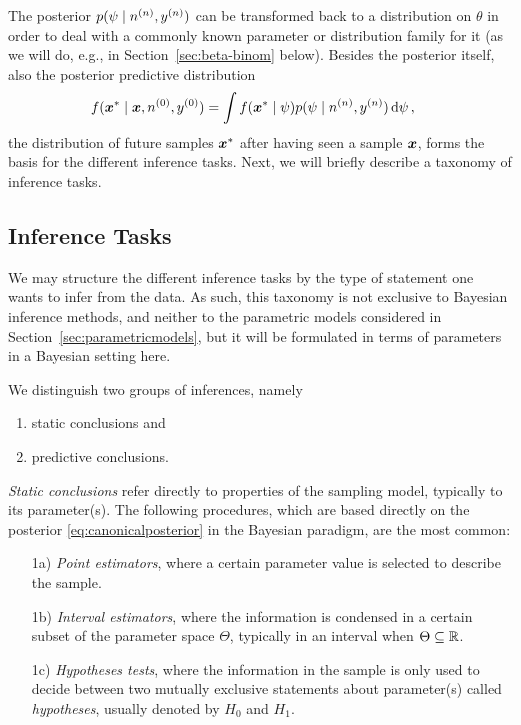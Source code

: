 The posterior $p(\psi \mid n^{(n)}, y^{(n)})$ can be transformed back to a distribution on $\theta$
in order to deal with a commonly known parameter or distribution family for it
(as we will do, e.g., in Section~\ref{sec:beta-binom} below).
Besides the posterior itself, also the posterior predictive distribution
\begin{align}
\label{eq:posteriorpredictive}
f({\bm x}^*\mid{\bm x}, n^{(0)}, y^{(0)}) &= \int f({\bm x}^* \mid \psi) p(\psi \mid n^{(n)}, y^{(n)}) \,\mathrm{d}\psi\,,
\end{align}
the distribution of future samples ${\bm x}^*$ after having seen a sample ${\bm x}$,
forms the basis for the different inference tasks. %
Next, we will briefly describe a taxonomy of inference tasks.


\subsection{Inference Tasks}
\label{sec:inferencetasks}

We may structure the different inference tasks by
the type of statement one wants to infer from the data.
As such, this taxonomy is not exclusive to Bayesian inference methods,
and neither to the parametric models considered in Section~\ref{sec:parametricmodels},
but it will be formulated in terms of parameters in a Bayesian setting here.

We distinguish two groups of inferences, namely
\begin{enumerate}
\item static conclusions and
\item predictive conclusions.%
\end{enumerate}

\emph{Static conclusions} refer directly to properties of the sampling model, typically to its parameter(s).
The following procedures, which are based directly on the posterior \eqref{eq:canonicalposterior} in the Bayesian paradigm,
are the most common:
\begin{enumerate}
\item[1a)] \emph{Point estimators},
where a certain parameter value is selected to describe the sample.
\item[1b)] \emph{Interval estimators},
where the information is condensed in a certain subset of the parameter space $\Theta$, typically in an interval when $\Theta \subseteq \mathbb{R}$.
\item[1c)] \emph{Hypotheses tests},
where the information in the sample is only used to decide between two mutually exclusive statements about parameter(s) called \emph{hypotheses},
usually denoted by $H_0$ and $H_1$.
\end{enumerate}

